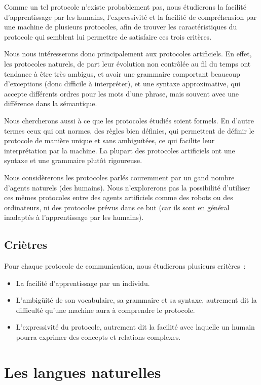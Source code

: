 \documentclass[french,a4paper]{article}
\begin{document}
Comme un tel protocole n'existe probablement pas, nous étudierons la
facilité d'apprentissage par les humains, l'expressivité et la
facilité de compréhension par une machine de plusieurs protocoles,
afin de trouver les caractéristiques du protocole qui semblent lui
permettre de satisfaire ces trois critères.

Nous nous intéresserons donc principalement aux protocoles
artificiels. En effet, les protocoles naturels, de part leur évolution
non contrôlée au fil du temps ont tendance à être très ambigus, et
avoir une grammaire comportant beaucoup d'exceptions (donc difficile à
interpréter), et une syntaxe approximative, qui accepte différents
ordres pour les mots d'une phrase, mais souvent avec une différence
dans la sémantique.

Nous chercherons aussi à ce que les protocoles étudiés soient
formels. En d'autre termes ceux qui ont normes, des règles bien
définies, qui permettent de définir le protocole de manière unique et
sans ambiguïtées, ce qui facilite leur interprétation par la
machine. La plupart des protocoles artificiels ont une syntaxe et une
grammaire plutôt rigoureuse.

Nous considèrerons les protocoles parlés couremment par un gand nombre
d'agents naturels (des humains). Nous n'explorerons pas la possibilité
d'utiliser ces mêmes protocoles entre des agents artificiels comme des
robots ou des ordinateurs, ni des protocoles prévus dans ce but (car
ils sont en général inadaptés à l'apprentissage par les humains).

\subsection{Criètres}
Pour chaque protocole de communication, nous étudierons plusieurs critères~:
\begin{itemize}
\item La facilité d'apprentissage par un individu.
\item L'ambigüité de son vocabulaire, sa grammaire et sa syntaxe,
  autrement dit la difficulté qu'une machine aura à comprendre le
  protocole.
\item L'expressivité du protocole, autrement dit la facilité avec
  laquelle un humain pourra exprimer des concepts et relations
  complexes.
\end{itemize}

\section{Les langues naturelles}
\end{document}
